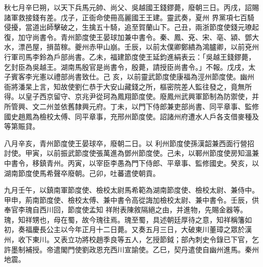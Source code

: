\begin{pinyinscope}
 秋七月辛巳朔，以天下兵馬元帥、尚父、吳越國王錢鏐薨，廢朝三日。丙戌，詔賜諸軍救接錢有差。戊子，正衙命使冊高麗國王王建。靈武奏，夏州
 界黨項七百騎侵擾，當道出師擊破之，生擒五十騎，追至賀蘭山下。己丑，兩浙節度使錢元璙起復，加守尚書令。青州節度使王晏球加兼中書令。秦、鳳、兗、宋、亳、潁、鄧大水，漂邑屋，損苗稼。夔州赤甲山崩。壬辰，以前太僕卿鄭繢為鴻臚卿，以前兗州行軍司馬李鈴為戶部尚書。乙未，福建節度使王延鈞進絹表云：「吳越王錢鏐薨，乞封臣為吳越王。湖南馬殷官是尚書令，殷薨，請授臣尚書令。」不報。戊戌，太子賓客李光憲以禮部尚書致仕。己
 亥，以前靈武節度使康福為涇州節度使。幽州衙將潘杲上言，知故使劉仁恭于大安山藏錢之所，樞密院差人監往發之，竟無所得。以皇子西京留守、京兆尹從珂為鳳翔節度使。廢鳳州武興軍節制為防禦使，并所管興、文二州並依舊隸興元府。丁未，以門下侍郎兼吏部尚書、同平章事、監修國史趙鳳為檢校太傅、同平章事，充邢州節度使。詔諸州府遭水人戶各支借麥種及等第賑貸。



 八月辛亥，青州節度使王晏球卒，廢朝二日。以
 利州節度使孫漢韶兼西面行營招討使。甲寅，以前振武節度使張萬進為鄧州節度使。己未，以鄆州節度使房知溫兼中書令，移鎮青州。丙寅，以宰臣李愚為門下侍郎、平章事、監修國史。癸亥，以湖南節度使馬希聲卒廢朝。己卯，吐蕃遣使朝貢。



 九月壬午，以鎮南軍節度使、檢校太尉馬希範為湖南節度使、檢校太尉、兼侍中。甲申，荊南節度使、檢校太傅、兼中書令高從誨加檢校太尉、兼中書令。壬辰，供奉官李瑰自西川回，節度使孟知
 祥附表陳敘隔絕之由，并進物，先賜金器等。瑰，知祥甥也，母在蜀，故今瑰往焉。瑰至蜀，具述朝廷厚待之意，知祥稱籓如初，奏福慶長公主以今年正月十二日薨。又奏五月三日，大破東川董璋之眾於漢州，收下東川。又表立功將校趙季良等五人，乞授節鉞；部內刺史令錄已下官，乞許墨制補授。帝遣閣門使劉政恩充西川宣諭使。乙巳，契丹遣使自幽州進馬。秦州地震。




\end{pinyinscope}
